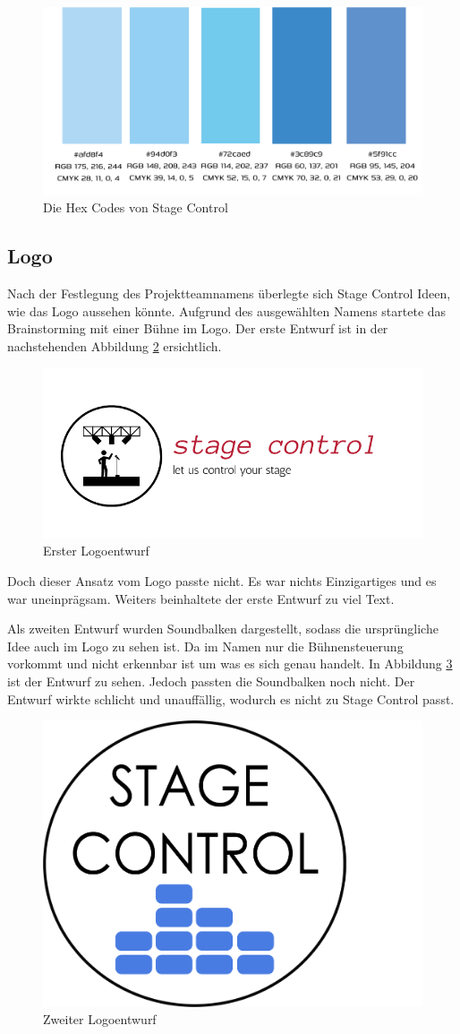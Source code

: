 \begin{figure}[H]
	\centering
	\includegraphics[width=0.7\linewidth]{images/Hexcode.png}
	\caption[Die Hex Codes von Stage Control]{Die Hex Codes von Stage Control}
	\label{fig:Hexcode}
\end{figure}


\subsection{Logo}
Nach der Festlegung des Projektteamnamens überlegte sich Stage Control Ideen, wie das Logo aussehen könnte. Aufgrund des ausgewählten Namens startete das Brainstorming mit einer Bühne im Logo. Der erste Entwurf ist in der nachstehenden Abbildung \ref{fig:Logoentwurf1} ersichtlich. 

\begin{figure}[H]
	\centering
	\includegraphics[width=0.5\linewidth]{images/Logoentwurf1.png}
	\caption[Erster Logoentwurf]{Erster Logoentwurf}
	\label{fig:Logoentwurf1}
\end{figure}

Doch dieser Ansatz vom Logo passte nicht. Es war nichts Einzigartiges und es war uneinprägsam. Weiters beinhaltete der erste Entwurf zu viel Text. 

Als zweiten Entwurf wurden Soundbalken dargestellt, sodass die ursprüngliche Idee auch im Logo zu sehen ist. Da im Namen nur die Bühnensteuerung vorkommt und nicht erkennbar ist um was es sich genau handelt. In Abbildung \ref{fig:Logoentwurf2} ist der Entwurf zu sehen. Jedoch passten die Soundbalken noch nicht. Der Entwurf wirkte schlicht und unauffällig, wodurch es nicht zu Stage Control passt. 

\begin{figure}[H]
	\centering
	\includegraphics[width=0.5\linewidth]{images/Logoentwurf2.png}
	\caption[Zweiter Logoentwurf]{Zweiter Logoentwurf}
	\label{fig:Logoentwurf2}
\end{figure}

